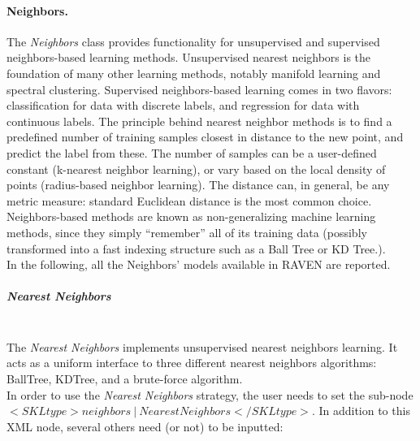 \paragraph{Neighbors.}
\label{Neighbors}
The \textit{Neighbors} class provides functionality for unsupervised and supervised neighbors-based learning methods. Unsupervised nearest neighbors is the foundation of many other learning methods, notably manifold learning and spectral clustering. Supervised neighbors-based learning comes in two flavors: classification for data with discrete labels, and regression for data with continuous labels.
The principle behind nearest neighbor methods is to find a predefined number of training samples closest in distance to the new point, and predict the label from these. The number of samples can be a user-defined constant (k-nearest neighbor learning), or vary based on the local density of points (radius-based neighbor learning). The distance can, in general, be any metric measure: standard Euclidean distance is the most common choice. Neighbors-based methods are known as non-generalizing machine learning methods, since they simply “remember” all of its training data (possibly transformed into a fast indexing structure such as a Ball Tree or KD Tree.).
\\In the following, all the Neighbors' models available in RAVEN are reported.
\subparagraph{Nearest Neighbors}
\mbox{}
\\The \textit{Nearest Neighbors} implements unsupervised nearest neighbors learning. It acts as a uniform interface to three different nearest neighbors algorithms: BallTree, KDTree, and a brute-force algorithm. 
\\In order to use the   \textit{Nearest Neighbors} strategy, the user needs to set the sub-node $<SKLtype>neighbors~\vert~NearestNeighbors</SKLtype>$. In addition to this XML node, several others need (or not) to be inputted:
